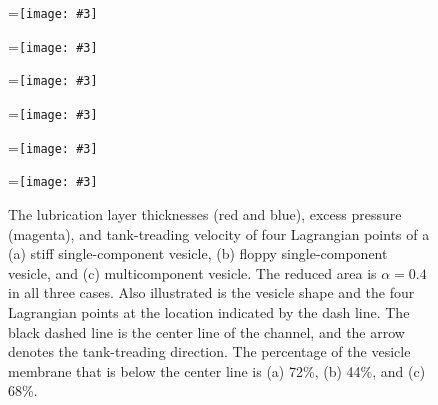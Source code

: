 \documentclass[twoside,twocolumn,9pt]{article}
\newcommand{\subfigimg}[3][,]{%
  \setbox1=\hbox{\texttt{[image: \#3]}}%
  \leavevmode\rlap{\usebox1}%
  \rlap{\hspace*{0pt}\raisebox{\dimexpr\ht1-0\baselineskip}{\bf
  \normalsize #2}}%
  \phantom{\usebox1}%
}
\begin{document}
\begin{figure}[t]
  \centering
  \subfigimg[width=0.3\linewidth]{(a)}{figures/Layer_Size_RAp4_SC.pdf}
  \subfigimg[width=0.3\linewidth]{(b)}{figures/Layer_Size_RAp4_SCp55.pdf}
  \subfigimg[width=0.3\linewidth]{(c)}{figures/Layer_Size_RAp4_MCp5.pdf}
  \subfigimg[width=0.3\linewidth,trim=0cm 6cm 28cm 0cm,clip=true]{}{figures/TankTreadingFigs_composite_SC.pdf}
  \subfigimg[width=0.3\linewidth,trim=0cm 6cm 28cm
  0cm,clip=true]{}{figures/TankTreadingFigs_composite_SCp55.pdf}
  \subfigimg[width=0.3\linewidth,trim=0cm 6cm 28cm
  0cm,clip=true]{}{figures/TankTreadingFigs_composite_MCp5.pdf}
  \caption{\label{fig:lubricationComposite} \small The lubrication layer
  thicknesses (red and blue), excess pressure (magenta), and
  tank-treading velocity of four Lagrangian points of a (a) stiff
  single-component vesicle, (b) floppy single-component vesicle, and (c)
  multicomponent vesicle. The reduced area is $\alpha = 0.4$ in all
  three cases. Also illustrated is the vesicle shape and the four
  Lagrangian points at the location indicated by the dash line. The
  black dashed line is the center line of the channel, and the arrow
  denotes the tank-treading direction. The percentage of the vesicle
  membrane that is below the center line is (a) 72\%, (b) 44\%, and (c)
  68\%.}
\end{figure}
\end{document}

